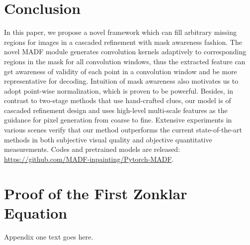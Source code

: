 \documentclass[journal]{IEEEtran}
\begin{document}
{}

\section{Conclusion}
In this paper, we propose a novel framework which can fill arbitrary missing regions for images in a cascaded refinement with mask awareness fashion. The novel MADF module generates convolution kernels adaptively to corresponding regions in the mask for all convolution windows, thus the extracted feature can get awareness of validity of each point in a convolution window and be more representative for decoding. Intuition of mask awareness also motivates us to adopt point-wise normalization, which is proven to be powerful.
Besides, in contrast to two-stage methods that use hand-crafted clues, our model is of cascaded refinement design and uses high-level multi-scale features as the guidance for pixel generation from coarse to fine. 
Extensive experiments in various scenes verify that our method outperforms the current state-of-the-art methods in both subjective visual quality and objective quantitative measurements. Codes and pretrained models are released: \url{https://github.com/MADF-inpainting/Pytorch-MADF}.








\iffalse
\appendices
\section{Proof of the First Zonklar Equation}
Appendix one text goes here.
\end{document}
